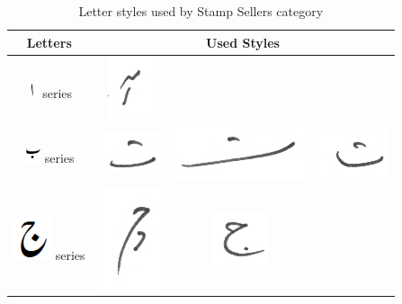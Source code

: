 \begin{table}[h]
\centering
\caption{Letter styles used by Stamp Sellers category}\label{tab6-ssc}
\begin{tabular}{@{}cccc@{}}
\hline
Letters	& \multicolumn{3}{c}{\textbf{Used Styles}} \\ \hline
\includegraphics[scale=0.50]{alif.png} series & \includegraphics[scale=0.25]{151} &  &   \\ 
\hline
\includegraphics[scale=0.50]{bay} series & \includegraphics[scale=0.20]{152} & \includegraphics[scale=0.20]{153}  &
\includegraphics[scale=0.20]{154}  \\
\hline
\includegraphics[scale=0.25]{jeeem} series & \includegraphics[scale=0.20]{155} & \includegraphics[scale=0.20]{156}  &

\end{tabular}
\end{table}
